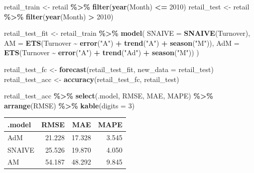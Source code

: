 \documentclass[
  11pt,
]{article}
\newenvironment{Shaded}{\begin{snugshade}}{\end{snugshade}}
\newcommand{\AttributeTok}[1]{\textcolor[rgb]{0.13,0.29,0.53}{#1}}
\newcommand{\DecValTok}[1]{\textcolor[rgb]{0.00,0.00,0.81}{#1}}
\newcommand{\FunctionTok}[1]{\textcolor[rgb]{0.13,0.29,0.53}{\textbf{#1}}}
\newcommand{\NormalTok}[1]{#1}
\newcommand{\OtherTok}[1]{\textcolor[rgb]{0.56,0.35,0.01}{#1}}
\newcommand{\SpecialCharTok}[1]{\textcolor[rgb]{0.81,0.36,0.00}{\textbf{#1}}}
\newcommand{\StringTok}[1]{\textcolor[rgb]{0.31,0.60,0.02}{#1}}
\newcounter{none} %
\begin{document}
\begin{Shaded}
\begin{Highlighting}[]
\NormalTok{retail\_train }\OtherTok{\textless{}{-}}\NormalTok{ retail }\SpecialCharTok{\%\textgreater{}\%} \FunctionTok{filter}\NormalTok{(}\FunctionTok{year}\NormalTok{(Month) }\SpecialCharTok{\textless{}=} \DecValTok{2010}\NormalTok{)}
\NormalTok{retail\_test }\OtherTok{\textless{}{-}}\NormalTok{ retail }\SpecialCharTok{\%\textgreater{}\%} \FunctionTok{filter}\NormalTok{(}\FunctionTok{year}\NormalTok{(Month) }\SpecialCharTok{\textgreater{}} \DecValTok{2010}\NormalTok{)}

\NormalTok{retail\_test\_fit }\OtherTok{\textless{}{-}}\NormalTok{ retail\_train }\SpecialCharTok{\%\textgreater{}\%}
  \FunctionTok{model}\NormalTok{(}
    \AttributeTok{SNAIVE =} \FunctionTok{SNAIVE}\NormalTok{(Turnover),}
    \AttributeTok{AM =} \FunctionTok{ETS}\NormalTok{(Turnover }\SpecialCharTok{\textasciitilde{}} \FunctionTok{error}\NormalTok{(}\StringTok{"A"}\NormalTok{) }\SpecialCharTok{+} \FunctionTok{trend}\NormalTok{(}\StringTok{"A"}\NormalTok{) }\SpecialCharTok{+} \FunctionTok{season}\NormalTok{(}\StringTok{"M"}\NormalTok{)),}
    \AttributeTok{AdM =} \FunctionTok{ETS}\NormalTok{(Turnover }\SpecialCharTok{\textasciitilde{}} \FunctionTok{error}\NormalTok{(}\StringTok{"A"}\NormalTok{) }\SpecialCharTok{+} \FunctionTok{trend}\NormalTok{(}\StringTok{"Ad"}\NormalTok{) }\SpecialCharTok{+} \FunctionTok{season}\NormalTok{(}\StringTok{"M"}\NormalTok{))}
\NormalTok{  )}

\NormalTok{retail\_test\_fc }\OtherTok{\textless{}{-}} \FunctionTok{forecast}\NormalTok{(retail\_test\_fit, }\AttributeTok{new\_data =}\NormalTok{ retail\_test)}
\NormalTok{retail\_test\_acc }\OtherTok{\textless{}{-}} \FunctionTok{accuracy}\NormalTok{(retail\_test\_fc, retail\_test)}

\NormalTok{retail\_test\_acc }\SpecialCharTok{\%\textgreater{}\%}
  \FunctionTok{select}\NormalTok{(.model, RMSE, MAE, MAPE) }\SpecialCharTok{\%\textgreater{}\%}
  \FunctionTok{arrange}\NormalTok{(RMSE) }\SpecialCharTok{\%\textgreater{}\%}
  \FunctionTok{kable}\NormalTok{(}\AttributeTok{digits =} \DecValTok{3}\NormalTok{)}
\end{Highlighting}
\end{Shaded}

{\def\LTcaptype{none} %
\begin{longtable}[]{@{}lrrr@{}}
\toprule\noalign{}
.model & RMSE & MAE & MAPE \\
\midrule\noalign{}
\endhead
\bottomrule\noalign{}
\endlastfoot
AdM & 21.228 & 17.328 & 3.545 \\
SNAIVE & 25.526 & 19.870 & 4.050 \\
AM & 54.187 & 48.292 & 9.845 \\
\end{longtable}
}
\end{document}
